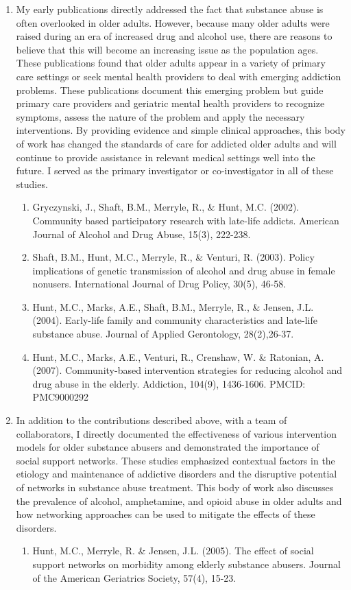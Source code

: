 \documentclass{nihbiosketch}
\begin{document}
\begin{enumerate}
\item My early publications directly addressed the fact that substance abuse is often overlooked in older adults. However, because many older adults were raised during an era of increased drug and alcohol use, there are reasons to believe that this will become an increasing issue as the population ages.   These publications found that older adults appear in a variety of primary care settings or seek mental health providers to deal with emerging addiction problems.  These publications document this emerging problem but guide primary care providers and geriatric mental health providers to recognize symptoms, assess the nature of the problem and apply the necessary interventions.   By providing evidence and simple clinical approaches, this body of work has changed the standards of care for addicted older adults and will continue to provide assistance in relevant medical settings well into the future.  I served as the primary investigator or co-investigator in all of these studies. 
\begin{enumerate}
\item Gryczynski, J., Shaft, B.M., Merryle, R., \& Hunt, M.C. (2002). Community based participatory research with late-life addicts. American Journal of Alcohol and Drug Abuse, 15(3), 222-238.

\item Shaft, B.M., Hunt, M.C., Merryle, R., \& Venturi, R. (2003). Policy implications of genetic transmission of alcohol and drug abuse in female nonusers. International Journal of Drug Policy, 30(5), 46-58.

\item Hunt, M.C., Marks, A.E., Shaft, B.M., Merryle, R., \& Jensen, J.L. (2004). Early-life family and community characteristics and late-life substance abuse. Journal of Applied Gerontology, 28(2),26-37.

\item Hunt, M.C., Marks, A.E., Venturi, R., Crenshaw, W. \& Ratonian, A. (2007). Community-based intervention strategies for reducing alcohol and drug abuse in the elderly.  Addiction, 104(9), 1436-1606. PMCID: PMC9000292
\end{enumerate}


\item In addition to the contributions described above, with a team of collaborators, I directly documented the effectiveness of various intervention models for older substance abusers and demonstrated the importance of social support networks.   These studies emphasized contextual factors in the etiology and maintenance of addictive disorders and the disruptive potential of networks in substance abuse treatment. This body of work also discusses the prevalence of alcohol, amphetamine, and opioid abuse in older adults and how networking approaches can be used to mitigate the effects of these disorders.    
\begin{enumerate}
\item Hunt, M.C., Merryle, R. \& Jensen, J.L. (2005). The effect of social support networks on morbidity among elderly substance abusers. Journal of the American Geriatrics Society, 57(4), 15-23.


\end{enumerate}
\end{enumerate}
\end{document}
